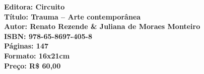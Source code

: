 

\vfill
\enlargethispage{\baselineskip}

\hspace*{-.4cm}\begin{minipage}[c]{1\linewidth}
\small\textbf{
\hspace*{-.1cm}Editora: Circuito\\
Título: Trauma -- Arte contemporânea\\
Autor: Renato Rezende \& Juliana de Moraes Monteiro\\ 
ISBN: 978-65-8697-405-8\\
Páginas:  147\\
Formato: 16x21cm\\
Preço: R\$ 60,00\\
}
\end{minipage}

\pagebreak

\vspace*{1.5cm}


\bigskip

\hfill{}\scalebox{.8}{MARCOS LACERDA}

\bigskip
\bigskip
\bigskip

